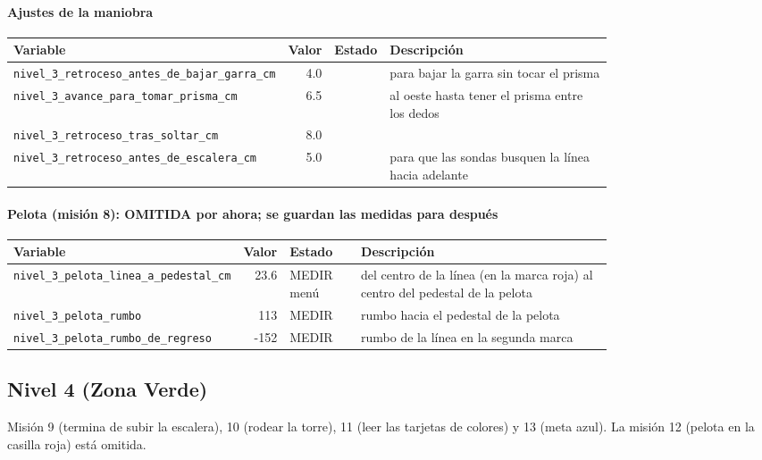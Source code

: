\paragraph{Ajustes de la maniobra}
\begin{longtable}{@{}p{0.36\linewidth}rlp{0.42\linewidth}@{}}\toprule
\textbf{Variable} & \textbf{Valor} & \textbf{Estado} & \textbf{Descripci\'on} \\\midrule\endhead
\texttt{nivel\_\allowbreak{}3\_\allowbreak{}retroceso\_\allowbreak{}antes\_\allowbreak{}de\_\allowbreak{}bajar\_\allowbreak{}garra\_\allowbreak{}cm} & 4.0 &  & para bajar la garra sin tocar el prisma \\
\texttt{nivel\_\allowbreak{}3\_\allowbreak{}avance\_\allowbreak{}para\_\allowbreak{}tomar\_\allowbreak{}prisma\_\allowbreak{}cm} & 6.5 &  & al oeste hasta tener el prisma entre los dedos \\
\texttt{nivel\_\allowbreak{}3\_\allowbreak{}retroceso\_\allowbreak{}tras\_\allowbreak{}soltar\_\allowbreak{}cm} & 8.0 &  &  \\
\texttt{nivel\_\allowbreak{}3\_\allowbreak{}retroceso\_\allowbreak{}antes\_\allowbreak{}de\_\allowbreak{}escalera\_\allowbreak{}cm} & 5.0 &  & para que las sondas busquen la línea hacia adelante \\
\bottomrule\end{longtable}
\paragraph{Pelota (misión 8): OMITIDA por ahora; se guardan las medidas para después}
\begin{longtable}{@{}p{0.36\linewidth}rlp{0.42\linewidth}@{}}\toprule
\textbf{Variable} & \textbf{Valor} & \textbf{Estado} & \textbf{Descripci\'on} \\\midrule\endhead
\texttt{nivel\_\allowbreak{}3\_\allowbreak{}pelota\_\allowbreak{}linea\_\allowbreak{}a\_\allowbreak{}pedestal\_\allowbreak{}cm} & 23.6 & MEDIR menú & del centro de la línea (en la marca roja) al centro del pedestal de la pelota \\
\texttt{nivel\_\allowbreak{}3\_\allowbreak{}pelota\_\allowbreak{}rumbo} & 113 & MEDIR & rumbo hacia el pedestal de la pelota \\
\texttt{nivel\_\allowbreak{}3\_\allowbreak{}pelota\_\allowbreak{}rumbo\_\allowbreak{}de\_\allowbreak{}regreso} & -152 & MEDIR & rumbo de la línea en la segunda marca \\
\bottomrule\end{longtable}
\subsection{Nivel 4 (Zona Verde)}
Misión 9 (termina de subir la escalera), 10 (rodear la torre), 11 (leer las tarjetas de colores) y 13 (meta azul). La misión 12 (pelota en la casilla roja) está omitida.

